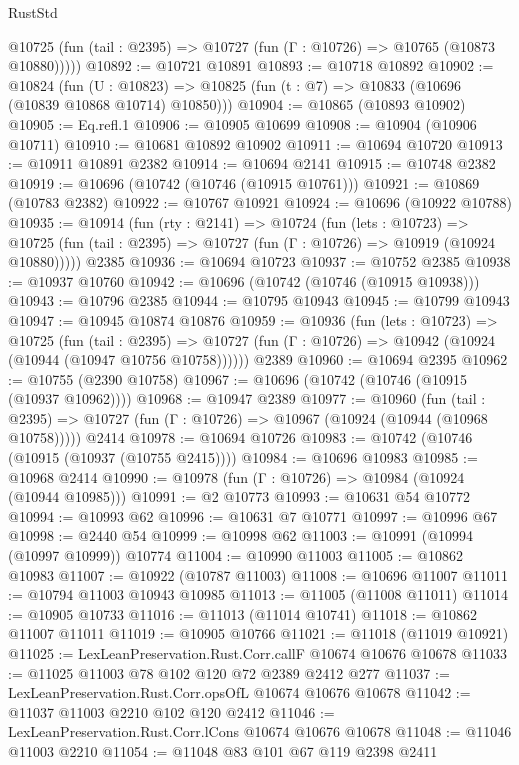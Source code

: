 \begin{lexlean}{RustStd}
\begin{coremodule}
      @10725 (fun (tail : @2395) => @10727 (fun (Γ : @10726) => @10765 (@10873 @10880)))))
@10892 := @10721 @10891
@10893 := @10718 @10892
@10902 := @10824
    (fun (U : @10823) => @10825 (fun (t : @7) => @10833 (@10696 (@10839 @10868 @10714) @10850)))
@10904 := @10865 (@10893 @10902)
@10905 := Eq.refl.{1}
@10906 := @10905 @10699
@10908 := @10904 (@10906 @10711)
@10910 := @10681 @10892 @10902
@10911 := @10694 @10720
@10913 := @10911 @10891 @2382
@10914 := @10694 @2141
@10915 := @10748 @2382
@10919 := @10696 (@10742 (@10746 (@10915 @10761)))
@10921 := @10869 (@10783 @2382)
@10922 := @10767 @10921
@10924 := @10696 (@10922 @10788)
@10935 := @10914
    (fun (rty : @2141) =>
    @10724
      (fun (lets : @10723) =>
      @10725 (fun (tail : @2395) => @10727 (fun (Γ : @10726) => @10919 (@10924 @10880)))))
    @2385
@10936 := @10694 @10723
@10937 := @10752 @2385
@10938 := @10937 @10760
@10942 := @10696 (@10742 (@10746 (@10915 @10938)))
@10943 := @10796 @2385
@10944 := @10795 @10943
@10945 := @10799 @10943
@10947 := @10945 @10874 @10876
@10959 := @10936
    (fun (lets : @10723) =>
    @10725
      (fun (tail : @2395) =>
      @10727 (fun (Γ : @10726) => @10942 (@10924 (@10944 (@10947 @10756 @10758))))))
    @2389
@10960 := @10694 @2395
@10962 := @10755 (@2390 @10758)
@10967 := @10696 (@10742 (@10746 (@10915 (@10937 @10962))))
@10968 := @10947 @2389
@10977 := @10960
    (fun (tail : @2395) => @10727 (fun (Γ : @10726) => @10967 (@10924 (@10944 (@10968 @10758)))))
    @2414
@10978 := @10694 @10726
@10983 := @10742 (@10746 (@10915 (@10937 (@10755 @2415))))
@10984 := @10696 @10983
@10985 := @10968 @2414
@10990 := @10978 (fun (Γ : @10726) => @10984 (@10924 (@10944 @10985)))
@10991 := @2 @10773
@10993 := @10631 @54 @10772
@10994 := @10993 @62
@10996 := @10631 @7 @10771
@10997 := @10996 @67
@10998 := @2440 @54
@10999 := @10998 @62
@11003 := @10991 (@10994 (@10997 @10999)) @10774
@11004 := @10990 @11003
@11005 := @10862 @10983
@11007 := @10922 (@10787 @11003)
@11008 := @10696 @11007
@11011 := @10794 @11003 @10943 @10985
@11013 := @11005 (@11008 @11011)
@11014 := @10905 @10733
@11016 := @11013 (@11014 @10741)
@11018 := @10862 @11007 @11011
@11019 := @10905 @10766
@11021 := @11018 (@11019 @10921)
@11025 := LexLeanPreservation.Rust.Corr.callF @10674 @10676 @10678
@11033 := @11025 @11003 @78 @102 @120 @72 @2389 @2412 @277
@11037 := LexLeanPreservation.Rust.Corr.opsOfL @10674 @10676 @10678
@11042 := @11037 @11003 @2210 @102 @120 @2412
@11046 := LexLeanPreservation.Rust.Corr.lCons @10674 @10676 @10678
@11048 := @11046 @11003 @2210
@11054 := @11048 @83 @101 @67 @119 @2398 @2411

\end{coremodule}
\end{lexlean}
